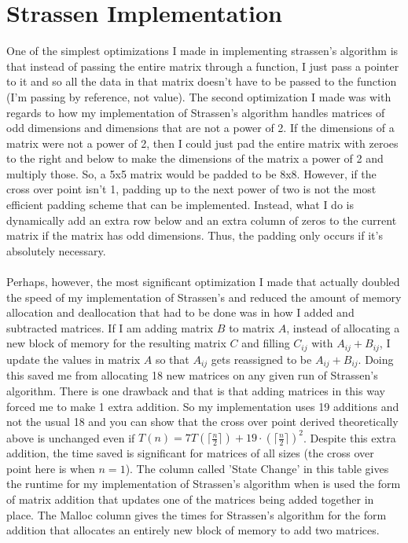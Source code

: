 \documentclass{article}
\begin{document}
\section{Strassen Implementation}
One of the simplest optimizations I made in implementing strassen's algorithm is that instead of passing the entire matrix through a function, I just pass a pointer to it and so all the data in that matrix doesn't have to be passed to the function (I'm passing by reference, not value).  The second optimization I made was with regards to how my implementation of Strassen's algorithm handles matrices of odd dimensions and dimensions that are not a power of 2.  If the dimensions of a matrix were not a power of 2, then I could just pad the entire matrix with zeroes to the right and below to make the dimensions of the matrix a power of 2 and multiply those.  So, a 5x5 matrix would be padded to be 8x8. However, if the cross over point isn't 1, padding up to the next power of two is not the most efficient padding scheme that can be implemented.  Instead, what I do is dynamically add an extra row below and an extra column of zeros to the current matrix if the matrix has odd dimensions.  Thus, the padding only occurs if it's absolutely necessary. \\\\
\noindent
Perhaps, however, the most significant optimization I made that actually doubled the speed of my implementation of Strassen's and reduced the amount of memory allocation and deallocation that had to be done was in how I added and subtracted matrices.  If I am adding matrix $B$ to matrix $A$, instead of allocating a new block of memory for the resulting matrix $C$ and filling $C_{ij}$ with $A_{ij} + B_{ij}$, I update the values in matrix $A$ so that $A_{ij}$ gets reassigned to be $A_{ij}+B_{ij}$. Doing this saved me from allocating 18 new matrices on any given run of Strassen's algorithm.  There is one drawback and that is that adding matrices in this way forced me to make 1 extra addition. So my implementation uses 19 additions and not the usual 18 and you can show that the cross over point derived theoretically above is unchanged even if $T(n) = 7T(\lceil \frac{n}{2} \rceil) + 19\cdot(\lceil \frac{n}{2} \rceil)^2$.  Despite this extra addition, the time saved is significant for matrices of all sizes (the cross over point here is when $n = 1$). The column called 'State Change' in this table gives the runtime for my implementation of Strassen's algorithm when is used the form of matrix addition that updates one of the matrices being added together in place.  The Malloc column gives the times for Strassen's algorithm for the form addition that allocates an entirely new block of memory to add two matrices.  \\ 
\end{document}
